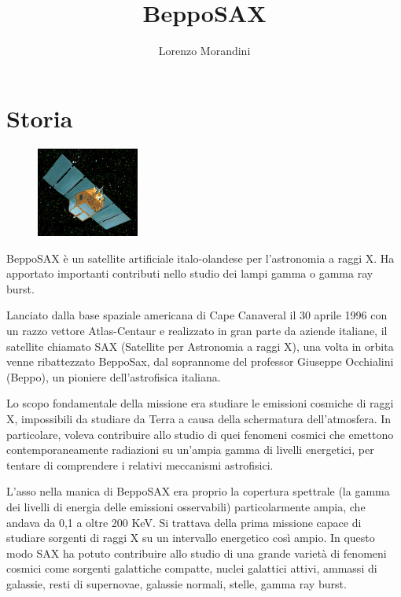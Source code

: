 \documentclass[12pt,a4paper]{article}
\begin{document}
\title{\vspace{-70pt}BeppoSAX}
\author{Lorenzo Morandini}
\date{}
\maketitle
\pagestyle{empty}
\thispagestyle{empty}

\def\nomedelsatellite{BeppoSAX}
\def\autore{Lorenzo Morandini}
\section*{Storia}
\label{storia}
\begin{figure}
  \vspace{-10pt}
  \begin{center}
    \includegraphics[width=0.30\textwidth]{satellite}
  \end{center}
  \vspace{-20pt}
\end{figure}
BeppoSAX è un satellite artificiale italo-olandese per l'astronomia a raggi X. Ha apportato importanti contributi nello studio dei lampi gamma o gamma ray burst.

Lanciato dalla base spaziale americana di Cape Canaveral il 30 aprile 1996 con un razzo vettore Atlas-Centaur e realizzato in gran parte da aziende italiane, il satellite chiamato SAX (Satellite per Astronomia a raggi X), una volta in orbita venne ribattezzato BeppoSax, dal soprannome del professor Giuseppe Occhialini (Beppo), un pioniere dell'astrofisica italiana.

Lo scopo fondamentale della missione era studiare le emissioni cosmiche di raggi X, impossibili da studiare da Terra a causa della schermatura dell'atmosfera. In particolare, voleva contribuire allo studio di quei fenomeni cosmici che emettono contemporaneamente radiazioni su un'ampia gamma di livelli energetici, per tentare di comprendere i relativi meccanismi astrofisici.

L'asso nella manica di BeppoSAX era proprio la copertura spettrale (la gamma dei livelli di energia delle emissioni osservabili) particolarmente ampia, che andava da 0,1 a oltre 200 KeV. Si trattava della prima missione capace di studiare sorgenti di raggi X su un intervallo energetico così ampio. In questo modo SAX ha potuto contribuire allo studio di una grande varietà di fenomeni cosmici come sorgenti galattiche compatte, nuclei galattici attivi, ammassi di galassie, resti di supernovae, galassie normali, stelle, gamma ray burst. 
\end{document}
